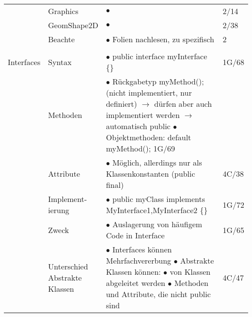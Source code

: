\documentclass[11pt,a4paper]{article}
\begin{document}
\begin{center}
\begin{longtable}[h]{ | p{2.3cm} | p{2.3cm} | p{12.6cm} | p{1.2cm} | }
	& Graphics & $\bullet$  & 2/14 \\ \cline{2-4}
	
	& GeomShape2D & $\bullet$  & 2/38 \\ \cline{2-4}
	
	& Beachte & $\bullet$ Folien nachlesen, zu spezifisch & 2 \\ \cline{2-4}
	\hline
	
	
	
	\multicolumn{3}{c}{} \\ 
	\hline 	
	
	
	
	{\large Interfaces} & Syntax & $\bullet$ public interface myInterface \{\} & 1G/68 \\ \cline{2-4}
	
	& Methoden & \makecell[l] {$\bullet$ Rückgabetyp myMethod(); (nicht implementiert, nur definiert) \\ 
	\hspace{0.4cm} $\rightarrow$ dürfen aber auch implementiert werden \\ 
	\hspace{0.4cm} $\rightarrow$ automatisch public \\ $\bullet$ Objektmethoden: default myMethod();} 1G/69 &  \\ \cline{2-4}
	
	& Attribute & $\bullet$ Möglich, allerdings nur als Klassenkonstanten (public final) & 4C/38 \\ \cline{2-4}
	
	& \makecell[l]{ Implement- \\ierung } & $\bullet$ public myClass implements MyInterface1,MyInterface2 \{\} & 1G/72 \\ \cline{2-4}
	
	& Zweck & $\bullet$ Auslagerung von häufigem Code in Interface & 1G/65 \\ \cline{2-4}
	& \makecell[l]{Unterschied \\ Abstrakte \\ Klassen} & \makecell[l]{$\bullet$ Interfaces können Mehrfachvererbung \\ 
	$\bullet$ Abstrakte Klassen können: \\ 
	\hspace{0.4cm} $\bullet$ von Klassen abgeleitet werden \\ 
	\hspace{0.4cm} $\bullet$ Methoden und Attribute, die nicht public sind} & 4C/47 \\ \cline{2-4}
	

\end{longtable}
\end{center}
\end{document}
